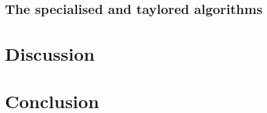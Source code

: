 \documentclass[reprint,english]{revtex4-1}
\begin{document}
\subsection{The specialised and taylored algorithms}


















\clearpage
\section{Discussion}
\section{Conclusion}
%
%
	 
\end{document}
